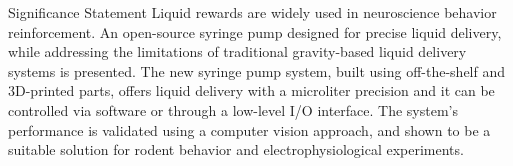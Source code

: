 {\large Significance Statement}
\newline
\textnormal{Liquid rewards are widely used in neuroscience behavior reinforcement. An open-source syringe pump designed for precise liquid delivery, while addressing the limitations of traditional gravity-based liquid delivery systems is presented. The new syringe pump system, built using off-the-shelf and 3D-printed parts, offers liquid delivery with a microliter precision and it can be controlled via software or through a low-level I/O interface. The system's performance is validated using a computer vision approach, and shown to be a suitable solution for rodent behavior and electrophysiological experiments.}
